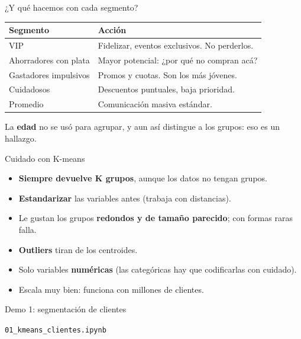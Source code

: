\documentclass{beamer}
\begin{document}
\begin{frame}{¿Y qué hacemos con cada segmento?}
    \centering
    \renewcommand{\arraystretch}{1.5}
    \begin{tabular}{@{}p{3.6cm}p{6.2cm}@{}}
        \toprule
        \textbf{Segmento} & \textbf{Acción} \\
        \midrule
        VIP & Fidelizar, eventos exclusivos. No perderlos. \\
        Ahorradores con plata & \alert{Mayor potencial}: ¿por qué no compran acá? \\
        Gastadores impulsivos & Promos y cuotas. Son los más jóvenes. \\
        Cuidadosos & Descuentos puntuales, baja prioridad. \\
        Promedio & Comunicación masiva estándar. \\
        \bottomrule
    \end{tabular}
    \vspace{0.8em}

    \small La \textbf{edad} no se usó para agrupar, y aun así distingue a los grupos: eso es un hallazgo.
\end{frame}

\begin{frame}{Cuidado con K-means}
    \begin{itemize}[<+->]
        \item \textbf{Siempre devuelve K grupos}, aunque los datos no tengan grupos.
        \item \textbf{Estandarizar} las variables antes (trabaja con distancias).
        \item Le gustan los grupos \textbf{redondos y de tamaño parecido}; con formas raras falla.
        \item \textbf{Outliers} tiran de los centroides.
        \item Solo variables \textbf{numéricas} (las categóricas hay que codificarlas con cuidado).
        \item Escala muy bien: funciona con millones de clientes.
    \end{itemize}
\end{frame}

\begin{frame}[standout]
    \centering
    {\Large Demo 1: segmentación de clientes\par}
    \vspace{0.6em}
    {\normalsize\texttt{01\_kmeans\_clientes.ipynb}\par}
\end{frame}
\end{document}
